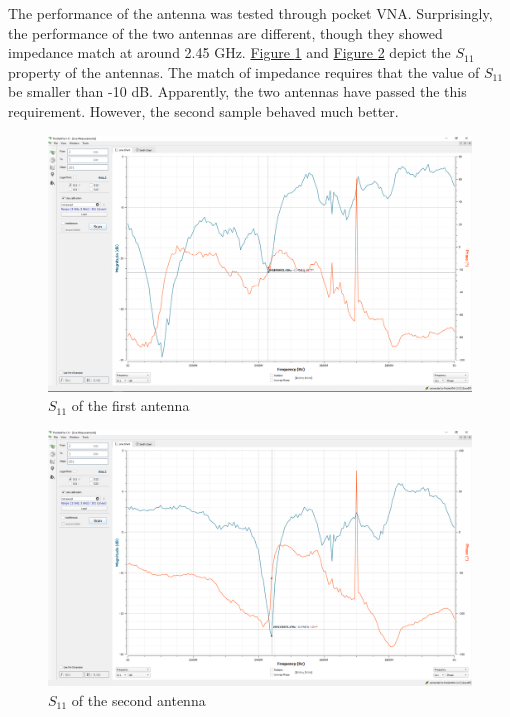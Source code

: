 \documentclass[12pt,a4paper]{report}
\begin{document}
The performance of the antenna was tested through pocket VNA. Surprisingly, the performance of the two antennas are different, though they showed impedance match at around 2.45 GHz. \hyperref[fig:s11_antenna_1]{Figure \ref*{fig:s11_antenna_1}} and \hyperref[fig:s11_antenna_2]{Figure \ref*{fig:s11_antenna_2}} depict the $S_{11}$ property of the antennas. The match of impedance requires that the value of $S_{11}$ be smaller than -10 dB. Apparently, the two antennas have passed the this requirement. However, the second sample behaved much better.

\begin{figure}[ht]
    \centerline{\includegraphics[scale=0.35]{s11_antenna_1}}
    \caption{$S_{11}$ of the first antenna}
    \label{fig:s11_antenna_1}
\end{figure}

\begin{figure}[ht]
    \centerline{\includegraphics[scale=0.35]{s11_antenna_2}}
    \caption{$S_{11}$ of the second antenna}
    \label{fig:s11_antenna_2}
\end{figure}
\end{document}
